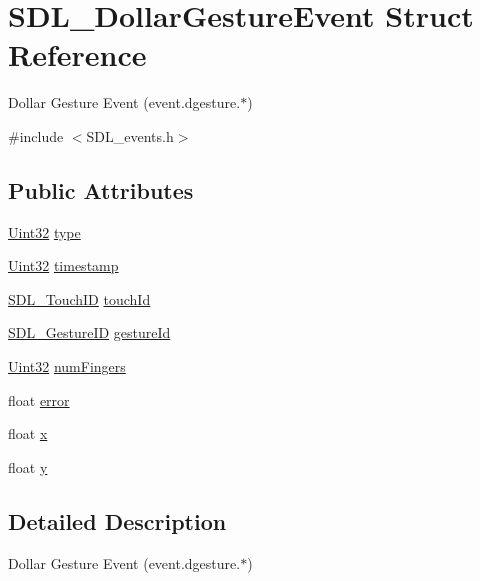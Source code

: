 \hypertarget{struct_s_d_l___dollar_gesture_event}{}\section{S\+D\+L\+\_\+\+Dollar\+Gesture\+Event Struct Reference}
\label{struct_s_d_l___dollar_gesture_event}


Dollar Gesture Event (event.\+dgesture.$\ast$)  




{\ttfamily \#include $<$S\+D\+L\+\_\+events.\+h$>$}

\subsection*{Public Attributes}
\begin{DoxyCompactItemize}
\item 
\hyperlink{_s_d_l__stdinc_8h_add440eff171ea5f55cb00c4a9ab8672d}{Uint32} \hyperlink{struct_s_d_l___dollar_gesture_event_ac7f6948754a1b2eb36edde043bf75ce9}{type}
\item 
\hyperlink{_s_d_l__stdinc_8h_add440eff171ea5f55cb00c4a9ab8672d}{Uint32} \hyperlink{struct_s_d_l___dollar_gesture_event_a3bccd8ebdf30b79c0f4074f6471ec583}{timestamp}
\item 
\hyperlink{_s_d_l__touch_8h_a10f5f86abe4ea8308a8706bd5d3b337a}{S\+D\+L\+\_\+\+Touch\+ID} \hyperlink{struct_s_d_l___dollar_gesture_event_a40402f6911ed0dba48e6b23aa02bd83d}{touch\+Id}
\item 
\hyperlink{_s_d_l__gesture_8h_a6c06ab0de82701c94809da9739ff8ac3}{S\+D\+L\+\_\+\+Gesture\+ID} \hyperlink{struct_s_d_l___dollar_gesture_event_a68968438eae9e58208b14e8c954dec31}{gesture\+Id}
\item 
\hyperlink{_s_d_l__stdinc_8h_add440eff171ea5f55cb00c4a9ab8672d}{Uint32} \hyperlink{struct_s_d_l___dollar_gesture_event_a14160d8bad8569f53dd18ed8f64d253f}{num\+Fingers}
\item 
float \hyperlink{struct_s_d_l___dollar_gesture_event_a30aaa8fe0df93615e6692aa20e9c13eb}{error}
\item 
float \hyperlink{struct_s_d_l___dollar_gesture_event_a9888449bd8842ed96494b4db16a6097b}{x}
\item 
float \hyperlink{struct_s_d_l___dollar_gesture_event_a293b2303acc1cfc63c167c5525e6eab5}{y}
\end{DoxyCompactItemize}


\subsection{Detailed Description}
Dollar Gesture Event (event.\+dgesture.$\ast$) 


